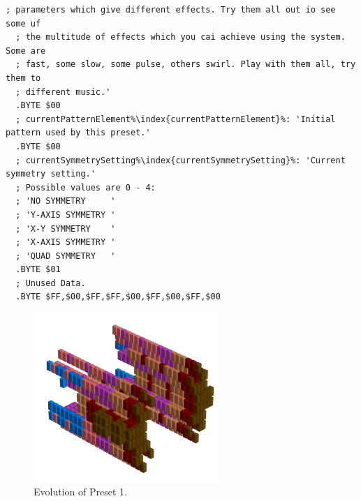 \begin{lstlisting}[basicstyle=\ttfamily\scriptsize,caption=Data structure for Preset 0.,escapechar=\%]
  ; parameters which give different effects. Try them all out io see some uf
  ; the multitude of effects which you cai achieve using the system. Some are
  ; fast, some slow, some pulse, others swirl. Play with them all, try them to
  ; different music.'
  .BYTE $00
  ; currentPatternElement%\index{currentPatternElement}%: 'Initial pattern used by this preset.'
  .BYTE $00
  ; currentSymmetrySetting%\index{currentSymmetrySetting}%: 'Current symmetry setting.'
  ; Possible values are 0 - 4:
  ; 'NO SYMMETRY     '
  ; 'Y-AXIS SYMMETRY '
  ; 'X-Y SYMMETRY    '
  ; 'X-AXIS SYMMETRY '
  ; 'QUAD SYMMETRY   '
  .BYTE $01
  ; Unused Data.
  .BYTE $FF,$00,$FF,$FF,$00,$FF,$00,$FF,$00
\end{lstlisting}

\clearpage
\begin{minipage}[b]{0.48\linewidth}
\begin{figure}[H]                                                          
  \centering                                                             
  \begin{adjustbox}{width=7cm,center}                                   
  \includegraphics[width=7cm]{src/presets/pattern1-45.png}%
  \end{adjustbox}                                                        
\caption{Evolution of Preset 1.}                                           
\end{figure}                                                               
\end{minipage}
\hspace{0.1cm}
